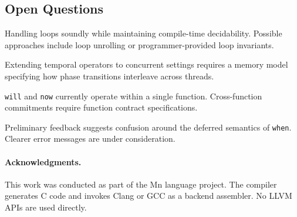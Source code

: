 \documentclass[11pt,a4paper]{article}
\begin{document}
\subsection{Open Questions}

\begin{description}[leftmargin=2em,itemsep=3pt]
  \item[Loop-aware Phase Graph.] Handling loops soundly while maintaining compile-time
    decidability. Possible approaches include loop unrolling or programmer-provided loop
    invariants.
  \item[Concurrency.] Extending temporal operators to concurrent settings requires a memory
    model specifying how phase transitions interleave across threads.
  \item[Compositionality.] \texttt{will} and \texttt{now} currently operate within a single
    function. Cross-function commitments require function contract specifications.
  \item[User experience.] Preliminary feedback suggests confusion around the deferred semantics
    of \texttt{when}. Clearer error messages are under consideration.
\end{description}

\paragraph{Acknowledgments.}
This work was conducted as part of the Mn language project. The compiler generates C code and
invokes Clang or GCC as a backend assembler. No LLVM APIs are used directly.
\end{document}
